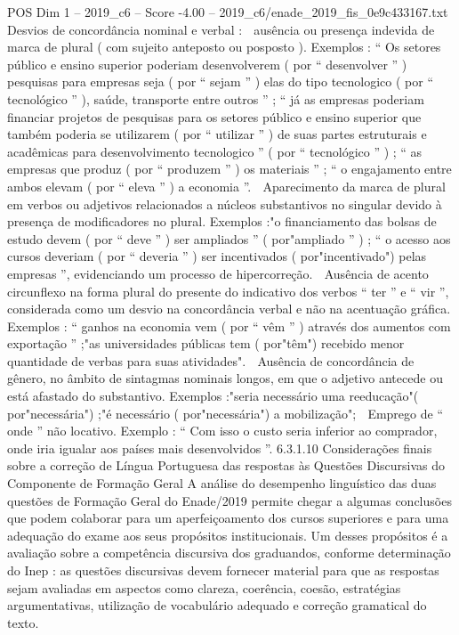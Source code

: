 \begin{textsample}{POS Dim 1 – 2019\_c6 – Score -4.00 – 2019\_c6/enade\_2019\_fis\_0e9c433167.txt}
Desvios de concordância nominal e verbal :  ausência ou presença indevida de marca de plural ( com sujeito anteposto ou posposto ).
Exemplos : “ Os setores público e ensino superior poderiam desenvolverem ( por “ desenvolver ” ) pesquisas para empresas seja ( por “ sejam ” ) elas do tipo tecnologico ( por “ tecnológico ” ), saúde, transporte entre outros ” ; “ já as empresas poderiam financiar projetos de pesquisas para os setores público e ensino superior que também poderia se utilizarem ( por “ utilizar ” ) de suas partes estruturais e acadêmicas para desenvolvimento tecnologico ” ( por “ tecnológico ” ) ; “ as empresas que produz ( por “ produzem ” ) os materiais ” ; “ o engajamento entre ambos elevam ( por “ eleva ” ) a economia ”.  Aparecimento da marca de plural em verbos ou adjetivos relacionados a núcleos substantivos no singular devido à presença de modificadores no plural.
Exemplos :"o financiamento das bolsas de estudo devem ( por “ deve ” ) ser ampliados ” ( por"ampliado ” ) ; “ o acesso aos cursos deveriam ( por “ deveria ” ) ser incentivados ( por"incentivado") pelas empresas ”, evidenciando um processo de hipercorreção.  Ausência de acento circunflexo na forma plural do presente do indicativo dos verbos “ ter ” e “ vir ”, considerada como um desvio na concordância verbal e não na acentuação gráfica.
Exemplos : “ ganhos na economia vem ( por “ vêm ” ) através dos aumentos com exportação ” ;"as universidades públicas tem ( por"têm") recebido menor quantidade de verbas para suas atividades".  Ausência de concordância de gênero, no âmbito de sintagmas nominais longos, em que o adjetivo antecede ou está afastado do substantivo.
Exemplos :"seria necessário uma reeducação"( por"necessária") ;"é necessário ( por"necessária") a mobilização";  Emprego de “ onde ” não locativo.
Exemplo : “ Com isso o custo seria inferior ao comprador, onde iria igualar aos países mais desenvolvidos ”. 6.3.1.10 Considerações finais sobre a correção de Língua Portuguesa das respostas às Questões Discursivas do Componente de Formação Geral A análise do desempenho linguístico das duas questões de Formação Geral do Enade/2019 permite chegar a algumas conclusões que podem colaborar para um aperfeiçoamento dos cursos superiores e para uma adequação do exame aos seus propósitos institucionais.
Um desses propósitos é a avaliação sobre a competência discursiva dos graduandos, conforme determinação do Inep : as questões discursivas devem fornecer material para que as respostas sejam avaliadas em aspectos como clareza, coerência, coesão, estratégias argumentativas, utilização de vocabulário adequado e correção gramatical do texto.

\end{textsample}
